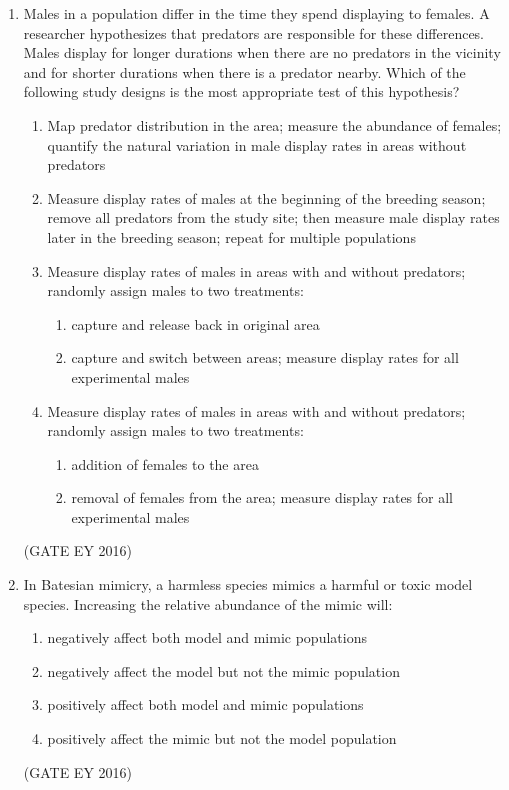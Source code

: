 \documentclass[journal]{IEEEtran}
\begin{document}
\begin{enumerate}
\item Males in a population differ in the time they spend displaying to females. A researcher hypothesizes that predators are responsible for these differences. Males display for longer durations when there are no predators in the vicinity and for shorter durations when there is a predator nearby. Which of the following study designs is the most appropriate test of this hypothesis?
\begin{enumerate}
    \item Map predator distribution in the area; measure the abundance of females;
quantify the natural variation in male display rates in areas without predators
    \item Measure display rates of males at the beginning of the breeding season;
remove all predators from the study site; then measure male display rates later in the breeding season;
repeat for multiple populations
    \item Measure display rates of males in areas with and without predators;
randomly assign males to two treatments: 
        \begin{enumerate}[label=(\roman*)]
        \item capture and release back in original area
        \item capture and switch between areas; measure display rates for all experimental males
    \end{enumerate}
    \item Measure display rates of males in areas with and without predators;
randomly assign males to two treatments:
        \begin{enumerate}[label=(\roman*)]
        \item addition of females to the area 
        \item removal of females from the area; measure display rates for all experimental males
    \end{enumerate} 
\end{enumerate}
\hfill{(GATE EY 2016)}

\item In Batesian mimicry, a harmless species mimics a harmful or toxic model species. Increasing the relative abundance of the mimic will:
\begin{enumerate}
    \item negatively affect both model and mimic populations
    \item negatively affect the model but not the mimic population
    \item positively affect both model and mimic populations
    \item positively affect the mimic but not the model population
\end{enumerate}
\hfill{(GATE EY 2016)}


\end{enumerate}
\end{document}
